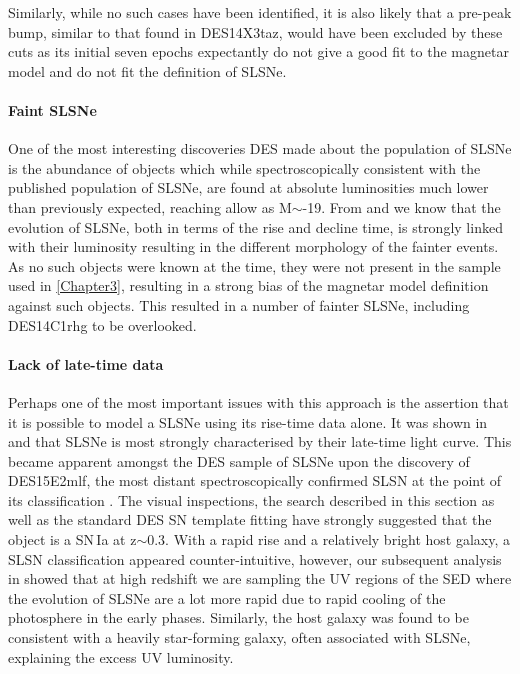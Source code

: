 Similarly, while no such cases have been identified, it is also likely that a pre-peak bump, similar to that found in DES14X3taz, would have been excluded by these cuts as its initial seven epochs expectantly do not give a good fit to the magnetar model and do not fit the definition of SLSNe.

\paragraph{Faint SLSNe}
One of the most interesting discoveries DES made about the population of SLSNe is the abundance of objects which while spectroscopically consistent with the published population of SLSNe, are found at absolute luminosities much lower than previously expected, reaching allow as M$\sim$-19. From \citet{Inserra2018a} and \citet{Nicholl2014, Nicholl2017} we know that the evolution of SLSNe, both in terms of the rise and decline time, is strongly linked with their luminosity resulting in the different morphology of the fainter events. As no such objects were known at the time, they were not present in the sample used in \cref{Chapter3}, resulting in a strong bias of the magnetar model definition against such objects. This resulted in a number of fainter SLSNe, including DES14C1rhg to be overlooked.

\paragraph{Lack of late-time data}
Perhaps one of the most important issues with this approach is the assertion that it is possible to model a SLSNe using its rise-time data alone. It was shown in \citet{Inserra2013} and \citet{Inserra2018a} that SLSNe is most strongly characterised by their late-time light curve. This became apparent amongst the DES sample of SLSNe upon the discovery of DES15E2mlf, the most distant spectroscopically confirmed SLSN at the point of its classification \citep{Pan2017}. The visual inspections, the search described in this section as well as the standard DES SN template fitting have strongly suggested that the object is a SN\,Ia at z$\sim$0.3. With a rapid rise and a relatively bright host galaxy, a SLSN classification appeared counter-intuitive, however, our subsequent analysis in \citet{Pan2017} showed that at high redshift we are sampling the UV regions of the SED where the evolution of SLSNe are a lot more rapid due to rapid cooling of the photosphere in the early phases. Similarly, the host galaxy was found to be consistent with a heavily star-forming galaxy, often associated with SLSNe, explaining the excess UV luminosity.

